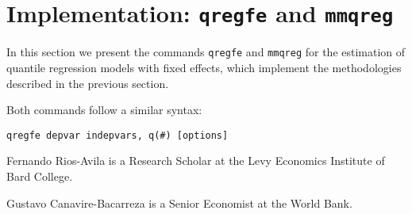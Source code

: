 \documentclass[bib]{statapress}
\begin{document}
\section{\texorpdfstring{Implementation: \texttt{qregfe} and
\texttt{mmqreg}}{Implementation: qregfe and mmqreg}}\label{sec-implementation}

In this section we present the commands \texttt{qregfe} and
\texttt{mmqreg} for the estimation of quantile regression models with
fixed effects, which implement the methodologies described in the
previous section.

Both commands follow a similar syntax:

\begin{verbatim}
qregfe depvar indepvars, q(#) [options]
\end{verbatim}

\clearpage





\begin{aboutauthors}

Fernando Rios-Avila is a Research Scholar at the Levy Economics
Institute of Bard College.

Gustavo Canavire-Bacarreza is a Senior Economist at the World Bank.

\end{aboutauthors}
\end{document}
